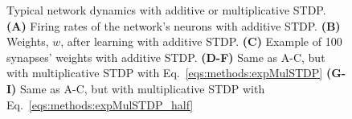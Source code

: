 \documentclass[utf8]{frontiers_suppmat} %
\begin{document}
\begin{subfigure}
\setcounter{figure}{1}
\setcounter{subfigure}{-1}
    \caption{Typical network dynamics with additive or multiplicative STDP. \textbf{(A)} Firing rates of the network's neurons with additive STDP. \textbf{(B)} Weights, $w$, after learning with additive STDP. \textbf{(C)} Example of \SI{100}{} synapses' weights with additive STDP. \textbf{(D-F)} Same as A-C, but with multiplicative STDP with Eq.~\ref{eqs:methods:expMulSTDP} \textbf{(G-I)} Same as A-C, but with multiplicative STDP with Eq.~\ref{eqs:methods:expMulSTDP_half}}
    \label{supplementary:figs:results}
\end{subfigure}



% 
\end{document}
